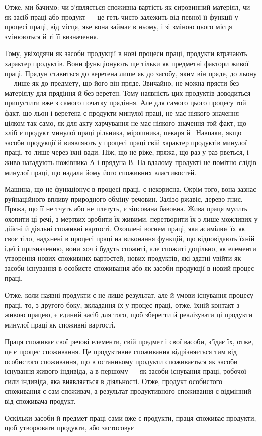 
Отже, ми бачимо: чи з’являється споживна вартість як сировинний
матеріял, чи як засіб праці або продукт — це геть чисто
залежить від певної її функції у процесі праці, від місця, яке
вона займає в ньому, і зі зміною цього місця змінюються й ті
її визначення.

Тому, увіходячи як засоби продукції в нові процеси праці,
продукти втрачають характер продуктів. Вони функціонують
ще тільки як предметні фактори живої праці. Прядун ставиться
до веретена лише як до засобу, яким він пряде, до льону — лише
як до предмету, що його він пряде. Звичайно, не можна прясти
без матеріялу для прядіння й без веретен. Тому наявність цих
продуктів доводиться припустити вже з самого початку прядіння.
Але для самого цього процесу той факт, що льон і веретена є
продукти минулої праці, не має ніякого значення цілком так
само, як для акту харчування не має ніякого значення той факт,
що хліб є продукт минулої праці рільника, мірошника, пекаря
й~ Навпаки, якщо засоби продукції й виявляють у процесі
праці свій характер продуктів минулої праці, то лише через їхні
вади. Ніж, що не ріже, пряжа, що раз-у-раз рветься, і~
живо нагадують ножівника $А$ і прядуна $В$. На вдалому продукті
не помітно слідів минулої праці, що надала йому його споживних
властивостей.

Машина, що не функціонує в процесі праці, є некорисна.
Окрім того, вона зазнає руйнаційного впливу природного обміну
речовин. Залізо ржавіє, дерево гниє. Пряжа, що її не тчуть або
не плетуть, є зіпсована бавовна. Жива праця мусить охопити
ці речі, з мертвих зробити їх живими, перетворити їх з лише
можливих у дійсні й діяльні споживні вартості. Охоплені вогнем
праці, яка асимілює їх як своє тіло, надхнені в процесі праці на виконання
функцій, що відповідають їхній ідеї і призначенню, вони
хоч і будуть спожиті, але спожиті доцільно, як елементи утворення
нових споживних вартостей, нових продуктів, які здатні
увійти як засоби існування в особисте споживання або як засоби
продукції в новий процес праці.

Отже, коли наявні продукти є не лише результат, але й умови
існування процесу праці, то, з другого боку, вкладання їх у
процес праці, отже, їхній контакт з живою працею, є єдиний
засіб для того, щоб зберегти й реалізувати ці продукти минулої
праці як споживні вартості.

Праця споживає свої речові елементи, свій предмет і свої
васоби, з’їдає їх, отже, це є процес споживання. Це продуктивне
споживання відрізняється тим від особистого споживання, що в
останньому продукти споживається як засоби існування живого
індивіда, а в першому — як засоби існування праці, робочої
сили індивіда, яка виявляється в діяльності. Отже, продукт особистого
споживання є сам споживач, а результат продуктивного
споживання є відмінний від споживача продукт.

Оскільки засоби й предмет праці сами вже є продукти, праця
споживає продукти, щоб утворювати продукти, або застосовує
\parbreak{}  %
